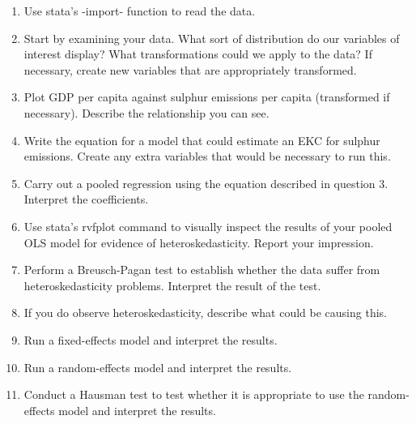 \documentclass{scrartcl}
\begin{document}
	\begin{enumerate}
	\item Use stata's -import- function to read the data. 
	
	\item Start by examining your data. What sort of distribution do our variables of interest display? What transformations could we apply to the data? If necessary, create new variables that are appropriately transformed.
	
	\item Plot GDP per capita against sulphur emissions per capita (transformed if necessary). Describe the relationship you can see.
	
	\item Write the equation for a model that could estimate an EKC for sulphur emissions. Create any extra variables that would be necessary to run this.
	
	\item Carry out a pooled regression using the equation described in question 3. Interpret the coefficients.
	
	\item Use stata's rvfplot command to visually inspect the results of your pooled OLS model for evidence of heteroskedasticity. Report your impression.
	
	\item Perform a Breusch-Pagan test to establish whether the data suffer from heteroskedasticity problems. Interpret the result of the test.
	
	\item If you do observe heteroskedasticity, describe what could be causing this. 
	\item Run a fixed-effects model and interpret the results.
	
	\item Run a random-effects model and interpret the results.
	
	\item Conduct a Hausman test to test whether it is appropriate to use the random-effects model and interpret the results.
	
	\end{enumerate}



\end{document}
